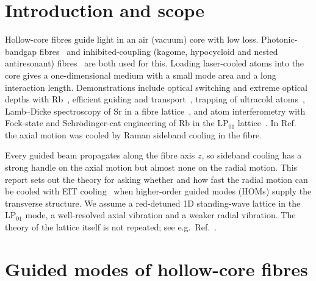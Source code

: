 \documentclass[11pt,a4paper]{article}
\begin{document}
\tableofcontents

\section{Introduction and scope}
Hollow-core fibres guide light in an air (vacuum) core with low loss. Photonic-bandgap fibres~\cite{cregan1999,russell2003} and inhibited-coupling (kagome, hypocycloid and nested antiresonant) fibres~\cite{benabid2002,poletti2014} are both used for this. Loading laser-cooled atoms into the core gives a one-dimensional medium with a small mode area and a long interaction length. Demonstrations include optical switching and extreme optical depths with Rb~\cite{bajcsy2009,bajcsy2011,blatt2014}, efficient guiding and transport~\cite{vorrath2010,hilton2018}, trapping of ultracold atoms~\cite{christensen2008}, Lamb--Dicke spectroscopy of Sr in a fibre lattice~\cite{okaba2014}, and atom interferometry with Fock-state and Schr\"odinger-cat engineering of Rb in the LP$_{01}$ lattice~\cite{xin2018,leong2020,wang2022}. In Ref.~\cite{leong2020} the axial motion was cooled by Raman sideband cooling in the fibre.

Every guided beam propagates along the fibre axis $z$, so sideband cooling has a strong handle on the axial motion but almost none on the radial motion. This report sets out the theory for asking whether and how fast the radial motion can be cooled with EIT cooling~\cite{morigi2000,roos2000,morigi2003} when higher-order guided modes (HOMs) supply the transverse structure. We assume a red-detuned 1D standing-wave lattice in the LP$_{01}$ mode, a well-resolved axial vibration and a weaker radial vibration. The theory of the lattice itself is not repeated; see e.g.\ Ref.~\cite{grimm2000}.

\section{Guided modes of hollow-core fibres}
\label{sec:modes}
\end{document}
